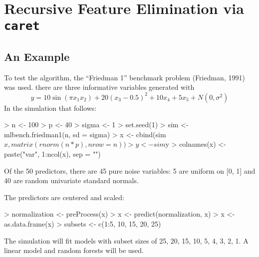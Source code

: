 \documentclass[12pt]{article}
\begin{document}
\clearpage
\section{Recursive Feature Elimination via \texttt{caret}}

\subsection{An Example}


To test the algorithm, the ``Friedman 1'' benchmark problem (Friedman, 1991) was used. there are three informative variables generated with
\[
y = 10 \sin(\pi x_1x_2) + 20 (x_3 - 0.5)^2 + 10 x_4 + 5 x_5 + N(0, \sigma^2)
\]
In the simulation that follows:
\begin{Schunk}
\begin{Sinput}
> n <- 100
> p <- 40
> sigma <- 1
> set.seed(1)
> sim <- mlbench.friedman1(n, sd = sigma)
> x <- cbind(sim$x, matrix(rnorm(n * p), nrow = n))
> y <- sim$y
> colnames(x) <- paste("var", 1:ncol(x), sep = "")
\end{Sinput}
\end{Schunk}
Of the 50 predictors, there are 45 pure noise variables: 5 are uniform on [0, 1] and 40 are random univariate standard normals.

The predictors are centered and scaled:
\begin{Schunk}
\begin{Sinput}
> normalization <- preProcess(x)
> x <- predict(normalization, x)
> x <- as.data.frame(x)
> subsets <- c(1:5, 10, 15, 20, 25)
\end{Sinput}
\end{Schunk}

The simulation will fit models with subset sizes of 25, 20, 15, 10, 5, 4, 3, 2, 1. A linear model and random forests will be used.
\end{document}
